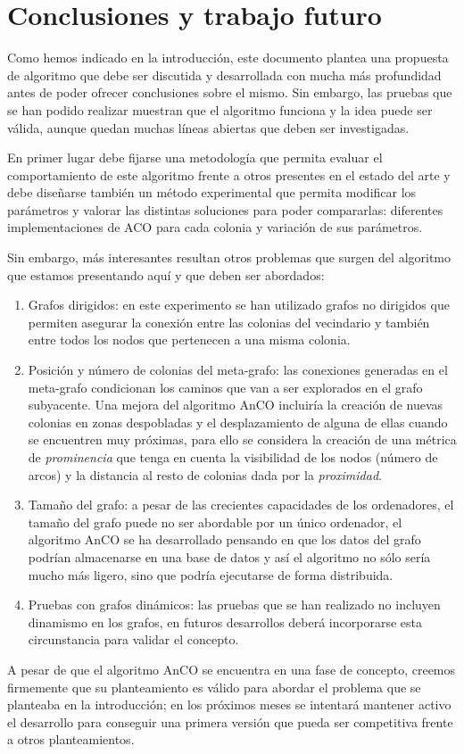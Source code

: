 \documentclass{llncs}
\begin{document}
\section{Conclusiones y trabajo futuro}
Como hemos indicado en la introducción, este documento plantea una propuesta de algoritmo que debe ser discutida y desarrollada con mucha más profundidad antes de poder ofrecer conclusiones sobre el mismo.
Sin embargo, las pruebas que se han podido realizar muestran que el algoritmo funciona y la idea puede ser válida, aunque quedan muchas líneas abiertas que deben ser investigadas.

En primer lugar debe fijarse una metodología que permita evaluar el comportamiento de este algoritmo frente a otros presentes en el estado del arte y debe diseñarse también un método experimental que permita modificar los parámetros y valorar las distintas soluciones para poder compararlas: diferentes implementaciones de ACO para cada colonia y variación de sus parámetros.

Sin embargo, más interesantes resultan otros problemas que surgen del algoritmo que estamos presentando aquí y que deben ser abordados:
\begin{enumerate}
  \item Grafos dirigidos: en este experimento se han utilizado grafos no dirigidos que permiten asegurar la conexión entre las colonias del vecindario y también entre todos los nodos que pertenecen a una misma colonia.
  \item Posición y número de colonias del meta-grafo: las conexiones generadas en el meta-grafo condicionan los caminos que van a ser explorados en el grafo subyacente. Una mejora del algoritmo AnCO incluiría la creación de nuevas colonias en zonas despobladas y el desplazamiento de alguna de ellas cuando se encuentren muy próximas, para ello se considera la creación de una métrica de \textit{prominencia} que tenga en cuenta la visibilidad de los nodos (número de arcos) y la distancia al resto de colonias dada por la \textit{proximidad}.
  \item Tamaño del grafo: a pesar de las crecientes capacidades de los ordenadores, el tamaño del grafo puede no ser abordable por un único ordenador, el algoritmo AnCO se ha desarrollado pensando en que los datos del grafo podrían almacenarse en una base de datos \cite{Rivero2011} y así el algoritmo no sólo sería mucho más ligero, sino que podría ejecutarse de forma distribuida.
  \item Pruebas con grafos dinámicos: las pruebas que se han realizado no incluyen dinamismo en los grafos, en futuros desarrollos deberá incorporarse esta circunstancia para validar el concepto.
\end{enumerate}

A pesar de que el algoritmo AnCO se encuentra en una fase de concepto, creemos firmemente que su planteamiento es válido para abordar el problema que se planteaba en la introducción; en los próximos meses se intentará mantener activo el desarrollo para conseguir una primera versión que pueda ser competitiva frente a otros planteamientos.



%
%

\end{document}
